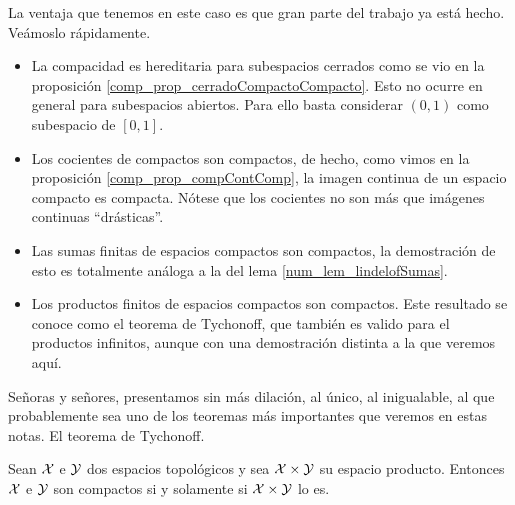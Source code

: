 La ventaja que tenemos en este caso es que gran parte del trabajo ya está hecho. Veámoslo rápidamente.
\begin{itemize}
	\item La compacidad es hereditaria para subespacios cerrados como se vio en la proposición \ref{comp_prop_cerradoCompactoCompacto}. Esto no ocurre en general para subespacios abiertos. Para ello basta considerar $(0,1)$ como subespacio de $[0,1]$.
	
	\item Los cocientes de compactos son compactos, de hecho, como vimos en la proposición \ref{comp_prop_compContComp}, la imagen continua de un espacio compacto es compacta. Nótese que los cocientes no son más que imágenes continuas ``drásticas''.
	
	\item Las sumas finitas de espacios compactos son compactos, la demostración de esto es totalmente análoga a la del lema \ref{num_lem_lindelofSumas}.
	\item Los productos finitos de espacios compactos son compactos. Este resultado se conoce como el teorema de Tychonoff, que también es valido para el productos infinitos, aunque con una demostración distinta a la que veremos aquí. 
\end{itemize}
Señoras y señores, presentamos sin más dilación, al único, al inigualable, al que probablemente sea uno de los teoremas más importantes que veremos en estas notas. El teorema de Tychonoff.
\begin{theo} Sean $\mathcal{X}$ e $\mathcal{Y}$ dos espacios topológicos y sea $\mathcal{X} \times \mathcal{Y}$ su espacio producto. Entonces $\mathcal{X}$ e $\mathcal{Y}$ son compactos si y solamente si $\mathcal{X}\times \mathcal{Y}$ lo es.
\end{theo}
